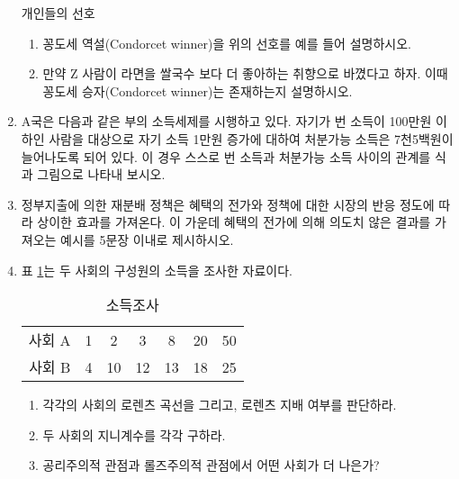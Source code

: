 \documentclass{article}
\begin{document}
\begin{enumerate}[{\bf 문제 \arabic*.}]
\begin{table}[htbp]
            \caption{개인들의 선호}
        \end{table}
        \begin{enumerate}
            \item 꽁도세 역설(Condorcet winner)을 위의 선호를 예를 들어 설명하시오.
            \item 만약 Z 사람이 라면을 쌀국수 보다 더 좋아하는 취향으로 바꼈다고 하자. 이때 꽁도세 승자(Condorcet winner)는 존재하는지 설명하시오.
        \end{enumerate}
    \item A국은 다음과 같은 부의 소득세제를 시행하고 있다. 자기가 번 소득이 100만원 이하인 사람을 대상으로 자기 소득 1만원 증가에 대하여 처분가능 소득은 7천5백원이 늘어나도록 되어 있다. 이 경우 스스로 번 소득과 처분가능 소득 사이의 관계를 식과 그림으로 나타내 보시오.
    \item 정부지출에 의한 재분배 정책은 혜택의 전가와 정책에 대한 시장의 반응 정도에 따라 상이한 효과를 가져온다. 이 가운데 혜택의 전가에 의해 의도치 않은 결과를 가져오는 예시를 5문장 이내로 제시하시오.
    \item 표 \ref{tab:incomed}는 두 사회의 구성원의 소득을 조사한 자료이다.
        \begin{table}[htbp]
            \centering
            \begin{tabular}{c|c|c|c|c|c|c}
                \toprule
                   사회 A & 1 & 2 & 3 & 8 & 20 & 50 \\
                   사회 B & 4 & 10 & 12 & 13 & 18 & 25 \\
                \bottomrule
            \end{tabular}
            \caption{소득조사}
            \label{tab:incomed}
        \end{table}
        \begin{enumerate}
            \item 각각의 사회의 로렌츠 곡선을 그리고, 로렌츠 지배 여부를 판단하라.
            \item 두 사회의 지니계수를 각각 구하라.
            \item 공리주의적 관점과 롤즈주의적 관점에서 어떤 사회가 더 나은가?
        \end{enumerate}
\end{enumerate}



\end{document}
